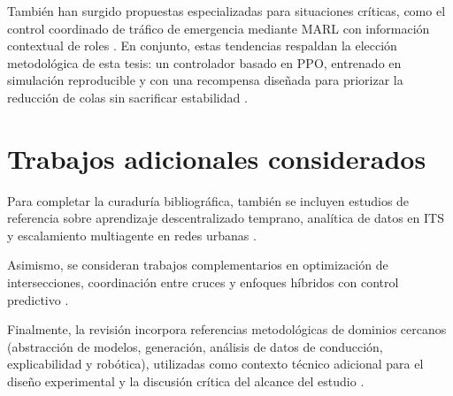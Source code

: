 También han surgido propuestas especializadas para situaciones críticas, como el control coordinado de tráfico de emergencia mediante MARL con información contextual de roles \cite{roleaware_zhang2025}. En conjunto, estas tendencias respaldan la elección metodológica de esta tesis: un controlador basado en PPO, entrenado en simulación reproducible y con una recompensa diseñada para priorizar la reducción de colas sin sacrificar estabilidad \cite{compare_ouyang2024,ppo_karedla2025}.

\section{Trabajos adicionales considerados}
Para completar la curaduría bibliográfica, también se incluyen estudios de referencia sobre aprendizaje descentralizado temprano, analítica de datos en ITS y escalamiento multiagente en redes urbanas \cite{excel_7_eltantawy2010,excel_8_zhu2019,excel_9_chen2020,excel_22_wang2021,excel_23_shabestary2018,excel_34_zhang2021}.

Asimismo, se consideran trabajos complementarios en optimización de intersecciones, coordinación entre cruces y enfoques híbridos con control predictivo \cite{excel_24_khattak2020,excel_30_ma2026,excel_36_tang2024,excel_38_ashwini2025}.

Finalmente, la revisión incorpora referencias metodológicas de dominios cercanos (abstracción de modelos, generación, análisis de datos de conducción, explicabilidad y robótica), utilizadas como contexto técnico adicional para el diseño experimental y la discusión crítica del alcance del estudio \cite{excel_13_kadioglu2024,excel_16_xu2024,excel_18_hu2022,excel_32_crielaard2018,excel_33_he2020}.
